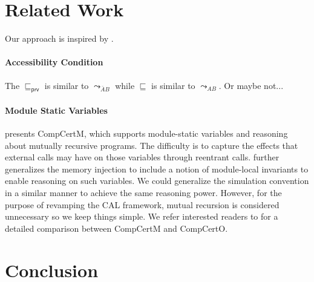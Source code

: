 \documentclass[acmsmall,screen,review,anonymous]{acmart}
\newcommand{\kw}[1]{\ensuremath{ \mathsf{#1} }}
\begin{document}


\section{Related Work}

Our approach is inspired by \citet{feedback,caots}.

\paragraph{Accessibility Condition}

The $\sqsubseteq_{\kw{prv}}$ is similar to $\leadsto_{\bar{A}B}$
while $\sqsubseteq$ is similar to $\leadsto_{AB}$. Or maybe not...

\paragraph{Module Static Variables}

\citet{compcertm} presents CompCertM,
which supports module-static variables
and reasoning about mutually recursive programs.
The difficulty is to capture the effects that external calls may have on
those variables through reentrant calls.
\citet{compcertm} further generalizes the memory injection
to include a notion of module-local invariants
to enable reasoning on such variables.
We could generalize the simulation convention in a similar manner
to achieve the same reasoning power.
However, for the purpose of revamping the CAL framework,
mutual recursion is considered unnecessary
so we keep things simple.
We refer interested readers to \citet{compcerto}
for a detailed comparison between CompCertM and CompCertO.


\section{Conclusion}


\end{document}
